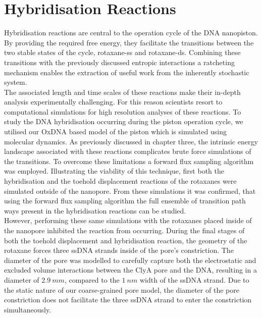 \section{Hybridisation Reactions}

Hybridisation reactions are central to the operation cycle of the DNA nanopiston. By
providing the required free energy, they facilitate the transitions between the two
stable states of the cycle, rotaxane-ss and rotaxane-ds. Combining these transitions with
the previously discussed entropic interactions a ratcheting mechanism enables the
extraction of useful work from the inherently stochastic system.\\

The associated length and time scales of these reactions make their in-depth analysis
experimentally challenging. For this reason scientists resort to computational
simulations for high resolution analyses of these reactions. To study the DNA
hybridisation occurring during the piston operation cycle, we utilised our OxDNA based
model of the
piston which is simulated using molecular dynamics. As previously discussed in chapter
three, the intrinsic energy landscape associated with these reactions complicates brute
force simulations of the transitions. To overcome these limitations a forward flux
sampling
algorithm was employed. Illustrating the viability of this technique, first both the
hybridisation and the toehold displacement reactions of the rotaxanes were simulated
outside of the nanopore. From these simulations it was confirmed, that using the forward
flux sampling algorithm the full ensemble of transition path ways present in the
hybridisation reactions can be studied.\\

However, performing these same simulations with the rotaxanes placed inside of the
nanopore inhibited the reaction from occurring. During the final stages of both the
toehold displacement and hybridisation reaction, the geometry of the rotaxane forces
three ssDNA strands inside of the pore's constriction. The diameter of the pore was
modelled to carefully capture both the electrostatic and excluded volume interactions
between the ClyA pore and the DNA, resulting in a diameter of $2.9\ mm$, compared to the
$1\ nm$ width of the ssDNA strand. Due to the static nature of our coarse-grained pore
model, the diameter of the pore constriction does not facilitate the three ssDNA strand
to enter the constriction simultaneously.\\

